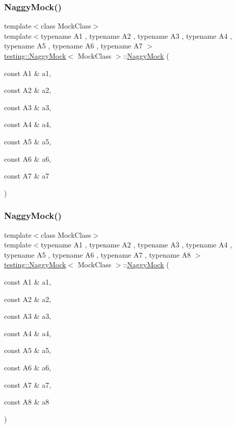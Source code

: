 \subsubsection{\texorpdfstring{NaggyMock()}{NaggyMock()}\hspace{0.1cm}{\footnotesize\ttfamily [8/11]}}
{\footnotesize\ttfamily template$<$class Mock\+Class$>$ \\
template$<$typename A1 , typename A2 , typename A3 , typename A4 , typename A5 , typename A6 , typename A7 $>$ \\
\mbox{\hyperlink{classtesting_1_1NaggyMock}{testing\+::\+Naggy\+Mock}}$<$ Mock\+Class $>$\+::\mbox{\hyperlink{classtesting_1_1NaggyMock}{Naggy\+Mock}} (\begin{DoxyParamCaption}\item[{const A1 \&}]{a1,  }\item[{const A2 \&}]{a2,  }\item[{const A3 \&}]{a3,  }\item[{const A4 \&}]{a4,  }\item[{const A5 \&}]{a5,  }\item[{const A6 \&}]{a6,  }\item[{const A7 \&}]{a7 }\end{DoxyParamCaption})\hspace{0.3cm}{\ttfamily [inline]}}

\mbox{\label{classtesting_1_1NaggyMock_a63b30506f56b792ffbdc5792a9630d5e}} 
\subsubsection{\texorpdfstring{NaggyMock()}{NaggyMock()}\hspace{0.1cm}{\footnotesize\ttfamily [9/11]}}
{\footnotesize\ttfamily template$<$class Mock\+Class$>$ \\
template$<$typename A1 , typename A2 , typename A3 , typename A4 , typename A5 , typename A6 , typename A7 , typename A8 $>$ \\
\mbox{\hyperlink{classtesting_1_1NaggyMock}{testing\+::\+Naggy\+Mock}}$<$ Mock\+Class $>$\+::\mbox{\hyperlink{classtesting_1_1NaggyMock}{Naggy\+Mock}} (\begin{DoxyParamCaption}\item[{const A1 \&}]{a1,  }\item[{const A2 \&}]{a2,  }\item[{const A3 \&}]{a3,  }\item[{const A4 \&}]{a4,  }\item[{const A5 \&}]{a5,  }\item[{const A6 \&}]{a6,  }\item[{const A7 \&}]{a7,  }\item[{const A8 \&}]{a8 }\end{DoxyParamCaption})\hspace{0.3cm}{\ttfamily [inline]}}

